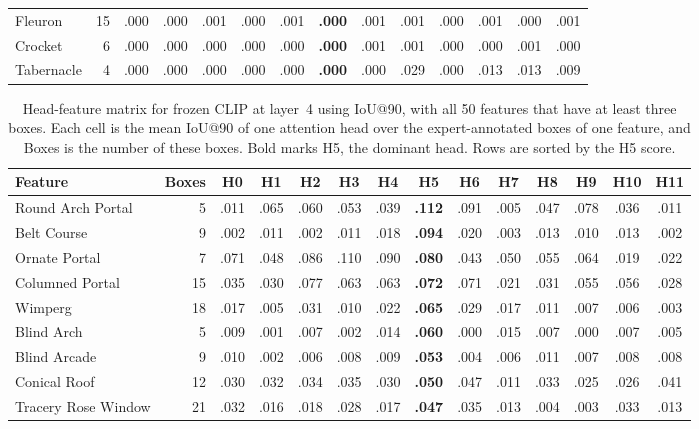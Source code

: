 \documentclass[lineno,pdflatex,sn-mathphys-num]{sn-jnl}%
\theoremstyle{thmstyleone}%
\theoremstyle{thmstyletwo}%
\theoremstyle{thmstylethree}%
\begin{document}
\begin{appendices}
\begin{table}[!htbp]
\begin{tabular}{@{}lrcccccccccccc@{}}
Fleuron & 15 & .000 & .000 & .001 & .000 & .001 & \textbf{.000} & .001 & .001 & .000 & .001 & .000 & .001 \\
Crocket & 6 & .000 & .000 & .000 & .000 & .000 & \textbf{.000} & .001 & .001 & .000 & .000 & .001 & .000 \\
Tabernacle & 4 & .000 & .000 & .000 & .000 & .000 & \textbf{.000} & .000 & .029 & .000 & .013 & .013 & .009 \\
\bottomrule
\end{tabular}
\end{table}

\begin{table}[!htbp]
\centering
\caption{Head-feature matrix for frozen CLIP at layer~4 using IoU@90, with all 50 features that have at least three boxes. Each cell is the mean IoU@90 of one attention head over the expert-annotated boxes of one feature, and Boxes is the number of these boxes. Bold marks H5, the dominant head. Rows are sorted by the H5 score.\label{table appendix head feature clip}}
\setlength{\tabcolsep}{3pt}
\begin{tabular}{@{}lrcccccccccccc@{}}
\toprule
Feature & Boxes & H0 & H1 & H2 & H3 & H4 & \textbf{H5} & H6 & H7 & H8 & H9 & H10 & H11 \\ \midrule
Round Arch Portal & 5 & .011 & .065 & .060 & .053 & .039 & \textbf{.112} & .091 & .005 & .047 & .078 & .036 & .011 \\
Belt Course & 9 & .002 & .011 & .002 & .011 & .018 & \textbf{.094} & .020 & .003 & .013 & .010 & .013 & .002 \\
Ornate Portal & 7 & .071 & .048 & .086 & .110 & .090 & \textbf{.080} & .043 & .050 & .055 & .064 & .019 & .022 \\
Columned Portal & 15 & .035 & .030 & .077 & .063 & .063 & \textbf{.072} & .071 & .021 & .031 & .055 & .056 & .028 \\
Wimperg & 18 & .017 & .005 & .031 & .010 & .022 & \textbf{.065} & .029 & .017 & .011 & .007 & .006 & .003 \\
Blind Arch & 5 & .009 & .001 & .007 & .002 & .014 & \textbf{.060} & .000 & .015 & .007 & .000 & .007 & .005 \\
Blind Arcade & 9 & .010 & .002 & .006 & .008 & .009 & \textbf{.053} & .004 & .006 & .011 & .007 & .008 & .008 \\
Conical Roof & 12 & .030 & .032 & .034 & .035 & .030 & \textbf{.050} & .047 & .011 & .033 & .025 & .026 & .041 \\
Tracery Rose Window & 21 & .032 & .016 & .018 & .028 & .017 & \textbf{.047} & .035 & .013 & .004 & .003 & .033 & .013 \\

\end{tabular}
\end{table}
\end{appendices}
\end{document}
